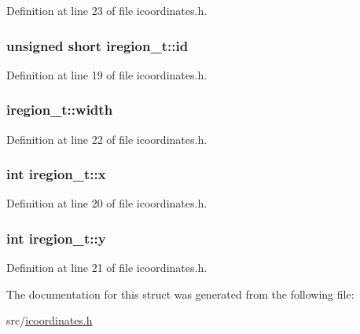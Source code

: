 Definition at line 23 of file icoordinates.\-h.

\hypertarget{structiregion__t_a09ef2d2779286827357a7c3290e65d9a}{
\subsubsection[{id}]{\setlength{\rightskip}{0pt plus 5cm}unsigned short iregion\-\_\-t\-::id}}\label{structiregion__t_a09ef2d2779286827357a7c3290e65d9a}


Definition at line 19 of file icoordinates.\-h.

\hypertarget{structiregion__t_abcafee0857bd757384813e53ddf879d9}{
\subsubsection[{width}]{ iregion\-\_\-t\-::width}}\label{structiregion__t_abcafee0857bd757384813e53ddf879d9}


Definition at line 22 of file icoordinates.\-h.

\hypertarget{structiregion__t_a244884f21e4d054538530e389755ac3e}{
\subsubsection[{x}]{\setlength{\rightskip}{0pt plus 5cm}int iregion\-\_\-t\-::x}}\label{structiregion__t_a244884f21e4d054538530e389755ac3e}


Definition at line 20 of file icoordinates.\-h.

\hypertarget{structiregion__t_a8b975f923a92e3969b4aec3d935af310}{
\subsubsection[{y}]{\setlength{\rightskip}{0pt plus 5cm}int iregion\-\_\-t\-::y}}\label{structiregion__t_a8b975f923a92e3969b4aec3d935af310}


Definition at line 21 of file icoordinates.\-h.



The documentation for this struct was generated from the following file\-:\begin{DoxyCompactItemize}
\item 
src/\hyperlink{icoordinates_8h}{icoordinates.\-h}\end{DoxyCompactItemize}
